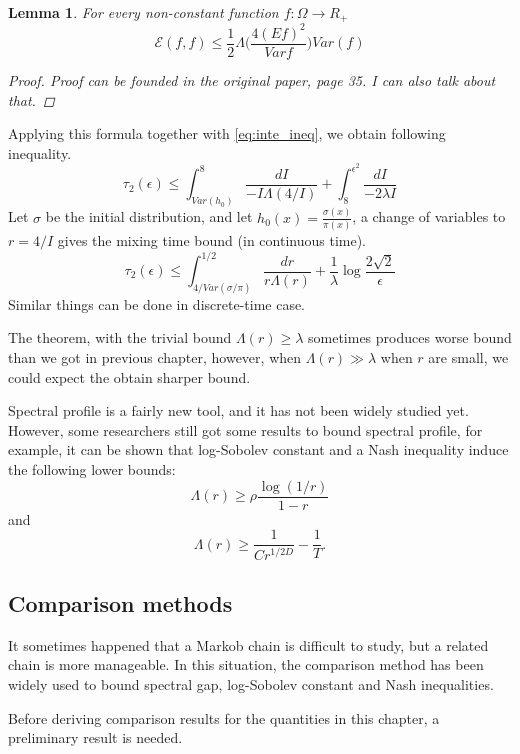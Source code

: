 \documentclass[12pt,reqno]{amsart}
\newtheorem{lem}[thm]{Lemma}
\begin{document}
\begin{lem}
  For every non-constant function $f:\Omega \rightarrow R_+$
  \begin{equation}
    \label{eq:new_bound}
    \mathcal{E}(f,f) \leq \frac{1}{2} \Lambda \bigg ( \frac{4(Ef)^2}{Var f} \bigg)Var(f)
  \end{equation}

  \begin{proof}
    Proof can be founded in the original paper, page 35. I can also talk about that.
  \end{proof}
\end{lem}

Applying this formula together with \eqref{eq:inte_ineq}, we obtain following inequality.
$$
\tau_2(\epsilon) \leq \int_{Var(h_0)}^8 \frac{dI}{-I\Lambda(4/I)} + \int_8^{\epsilon^2}\frac{dI}{-2\lambda I}
$$
Let $\sigma$ be the initial distribution, and let $h_0(x)=\frac{\sigma(x)}{\pi(x)}$, a change of variables to $r = 4/I$ gives the mixing time bound (in continuous time).
\begin{equation}
  \label{eq:prof_bound}
  \tau_2(\epsilon) \leq \int_{4/Var(\sigma/\pi)}^{1/2} \frac{dr}{r\Lambda(r)} + \frac{1}{\lambda} \log \frac{2\sqrt{2}}{\epsilon}
\end{equation}
Similar things can be done in discrete-time case.

The theorem, with the trivial bound $\Lambda(r)\geq \lambda$ sometimes produces worse bound than we got in previous chapter, however, when $\Lambda(r) \gg \lambda$ when $r$ are small, we could expect the obtain sharper bound.

Spectral profile is a fairly new tool, and it has not been widely studied yet. However, some researchers still got some results to bound spectral profile, for example, it can be shown that log-Sobolev constant and a Nash inequality induce the following lower bounds:
$$
\Lambda(r) \geq \rho \frac{\log(1/r)}{1-r}
$$
and 
$$
\Lambda(r) \geq \frac{1}{Cr^{1/2D}} - \frac{1}{T}.
$$

\subsection{Comparison methods}
It sometimes happened that a Markob chain is difficult to study, but a related chain is more manageable. In this situation, the comparison method has been widely used to bound spectral gap, log-Sobolev constant and Nash inequalities.

Before deriving comparison results for the quantities in this chapter, a preliminary result is needed.
\end{document}

